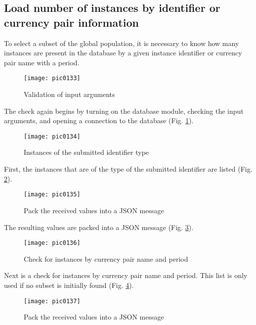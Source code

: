 \subsection{Load number of instances by identifier or currency pair information}

To select a subset of the global population, it is necessary to know how many instances are present in the database by a given instance identifier or currency pair name with a period.

\begin{figure}[h]
\centering
\texttt{[image: pic0133]}
\caption{Validation of input arguments}
\label{fig:pic0133}
\end{figure}
\FloatBarrier

The check again begins by turning on the database module, checking the input arguments, and opening a connection to the database (Fig. \ref{fig:pic0133}).

\begin{figure}[h]
\centering
\texttt{[image: pic0134]}
\caption{Instances of the submitted identifier type}
\label{fig:pic0134}
\end{figure}
\FloatBarrier

First, the instances that are of the type of the submitted identifier are listed (Fig. \ref{fig:pic0134}).

\begin{figure}[h]
\centering
\texttt{[image: pic0135]}
\caption{Pack the received values into a JSON message}
\label{fig:pic0135}
\end{figure}
\FloatBarrier

The resulting values are packed into a JSON message (Fig. \ref{fig:pic0135}).

\begin{figure}[h]
\centering
\texttt{[image: pic0136]}
\caption{Check for instances by currency pair name and period}
\label{fig:pic0136}
\end{figure}
\FloatBarrier

Next is a check for instances by currency pair name and period. This list is only used if no subset is initially found (Fig. \ref{fig:pic0136}).

\begin{figure}[h]
\centering
\texttt{[image: pic0137]}
\caption{Pack the received values into a JSON message}
\label{fig:pic0137}
\end{figure}
\FloatBarrier


